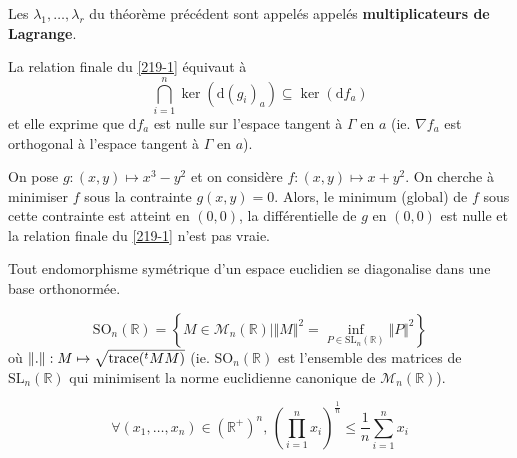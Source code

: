 	\begin{definition}
		Les $\lambda_1, \dots, \lambda_r$ du théorème précédent sont appelés appelés \textbf{multiplicateurs de Lagrange}.
	\end{definition}


	\begin{remark}
		La relation finale du \cref{219-1} équivaut à
		\[ \bigcap_{i=1}^n \ker(\mathrm{d}(g_i)_a) \subseteq \ker(\mathrm{d}f_a) \]
		et elle exprime que $\mathrm{d}f_a$ est nulle sur l'espace tangent à $\Gamma$ en $a$ (ie. $\nabla f_a$ est orthogonal à l'espace tangent à $\Gamma$ en $a$).
	\end{remark}

	\begin{cexample}
		On pose $g : (x,y) \mapsto x^3-y^2$ et on considère $f : (x, y) \mapsto x+y^2$. On cherche à minimiser $f$ sous la contrainte $g(x,y) = 0$.
		\newpar
		Alors, le minimum (global) de $f$ sous cette contrainte est atteint en $(0,0)$, la différentielle de $g$ en $(0,0)$ est nulle et la relation finale du \cref{219-1} n'est pas vraie.
	\end{cexample}

	\begin{application}
		Tout endomorphisme symétrique d'un espace euclidien se diagonalise dans une base orthonormée.
	\end{application}


	\begin{application}
		\[ \mathrm{SO}_n(\mathbb{R}) = \left\{ M \in \mathcal{M}_n(\mathbb{R}) \mid \Vert M \Vert^2 = \inf_{P \in \mathrm{SL}_n(\mathbb{R})} \Vert P \Vert^2 \right\} \]
		où $\Vert . \Vert : M \mapsto \sqrt{\operatorname{trace}(\mathstrut ^t MM)}$ (ie. $\mathrm{SO}_n(\mathbb{R})$ est l'ensemble des matrices de $\mathrm{SL}_n(\mathbb{R})$ qui minimisent la norme euclidienne canonique de $\mathcal{M}_n(\mathbb{R})$).
	\end{application}


	\begin{application}
		\[ \forall (x_1, \dots, x_n) \in (\mathbb{R}^+)^n, \, \left( \prod_{i=1}^{n} x_i \right)^{\frac{1}{n}} \leq \frac{1}{n} \sum_{i=1}^n x_i \]
	\end{application}


